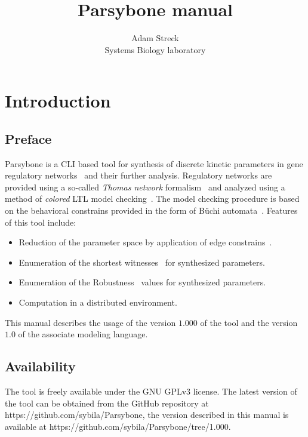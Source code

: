 \documentclass[12pt]{article}
\title{Parsybone  manual}
\author{Adam Streck \\
		Systems Biology laboratory}
\begin{document}
\maketitle

\section{Introduction}
\subsection{Preface}
Parsybone is a CLI based tool for synthesis of discrete kinetic parameters in gene regulatory networks~\cite{TCBB2011} and their further analysis. Regulatory networks are provided using a so-called \emph{Thomas network} formalism~\cite{ThomasR1991} and analyzed using a method of \emph{colored} LTL model checking~\cite{TechReport}. The model checking procedure is based on the behavioral constrains provided in the form of B\"uchi automata~\cite{MCBible}. Features of this tool include:

\begin{itemize}
\item Reduction of the parameter space by application of edge constrains~\cite{TCBB2012}.
\item Enumeration of the shortest witnesses~\cite{TechReport} for synthesized parameters.
\item Enumeration of the \textrm{Robustness}~\cite{TechReport} values for synthesized parameters.
\item Computation in a distributed environment.
\end{itemize}

This manual describes the usage of the version $1.000$ of the tool and the version $1.0$ of the associate modeling language.

\subsection{Availability}
 The tool is freely available under the GNU GPLv3 license. The latest version of the tool can be obtained from the GitHub repository at https://github.com/sybila/Parsybone, the version described in this manual is available at https://github.com/sybila/Parsybone/tree/1.000. 
\end{document}
